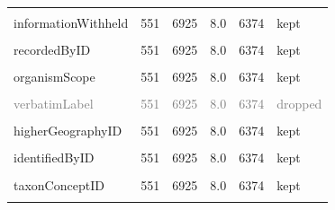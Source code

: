 \documentclass[sn-apa,pdflatex]{sn-jnl}
\begin{document}
\begin{longtable}[t]{lrrrrl}
\cellcolor{gray!10}{type} & \cellcolor{gray!10}{551} & \cellcolor{gray!10}{6925} & \cellcolor{gray!10}{8.0} & \cellcolor{gray!10}{6374} & \cellcolor{gray!10}{kept}\\
informationWithheld & 551 & 6925 & 8.0 & 6374 & kept\\
\cellcolor{gray!10}{dataGeneralizations} & \cellcolor{gray!10}{551} & \cellcolor{gray!10}{6925} & \cellcolor{gray!10}{8.0} & \cellcolor{gray!10}{6374} & \cellcolor{gray!10}{kept}\\
\addlinespace
recordedByID & 551 & 6925 & 8.0 & 6374 & kept\\
\textcolor{gray}{\cellcolor{gray!10}{vitality}} & \textcolor{gray}{\cellcolor{gray!10}{551}} & \textcolor{gray}{\cellcolor{gray!10}{6925}} & \textcolor{gray}{\cellcolor{gray!10}{8.0}} & \textcolor{gray}{\cellcolor{gray!10}{6374}} & \textcolor{gray}{\cellcolor{gray!10}{dropped}}\\
organismScope & 551 & 6925 & 8.0 & 6374 & kept\\
\cellcolor{gray!10}{organismRemarks} & \cellcolor{gray!10}{551} & \cellcolor{gray!10}{6925} & \cellcolor{gray!10}{8.0} & \cellcolor{gray!10}{6374} & \cellcolor{gray!10}{kept}\\
\textcolor{gray}{verbatimLabel} & \textcolor{gray}{551} & \textcolor{gray}{6925} & \textcolor{gray}{8.0} & \textcolor{gray}{6374} & \textcolor{gray}{dropped}\\
\addlinespace
\cellcolor{gray!10}{parentEventID} & \cellcolor{gray!10}{551} & \cellcolor{gray!10}{6925} & \cellcolor{gray!10}{8.0} & \cellcolor{gray!10}{6374} & \cellcolor{gray!10}{kept}\\
higherGeographyID & 551 & 6925 & 8.0 & 6374 & kept\\
\cellcolor{gray!10}{identificationID} & \cellcolor{gray!10}{551} & \cellcolor{gray!10}{6925} & \cellcolor{gray!10}{8.0} & \cellcolor{gray!10}{6374} & \cellcolor{gray!10}{kept}\\
identifiedByID & 551 & 6925 & 8.0 & 6374 & kept\\
\cellcolor{gray!10}{acceptedNameUsageID} & \cellcolor{gray!10}{551} & \cellcolor{gray!10}{6925} & \cellcolor{gray!10}{8.0} & \cellcolor{gray!10}{6374} & \cellcolor{gray!10}{kept}\\
\addlinespace
taxonConceptID & 551 & 6925 & 8.0 & 6374 & kept\\
\cellcolor{gray!10}{acceptedNameUsage} & \cellcolor{gray!10}{551} & \cellcolor{gray!10}{6925} & \cellcolor{gray!10}{8.0} & \cellcolor{gray!10}{6374} & \cellcolor{gray!10}{kept}\\

\end{longtable}
\end{document}
